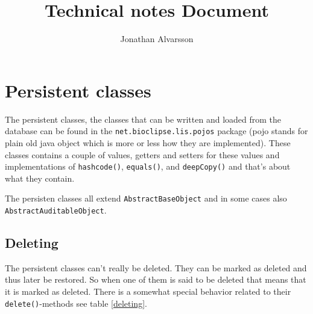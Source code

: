 \documentclass[a4paper,10pt]{article}
\title{Technical notes Document}
\author{Jonathan Alvarsson}
\begin{document}
        
    \pagestyle{fancy}	

    \renewcommand{\sectionmark}[1]{\markboth{#1}{}}

    \fancyhead{}

    \fancyhead[RO]{\large\textbf{{\leftmark}}}

    \fancyhead[LO]{\large\textbf{\today}}

    \headheight=18pt
        
    \setcounter{tocdepth}{3}
        
    \maketitle 
    \newpage 
    
    \tableofcontents 
    \newpage
        
	\section{Persistent classes}
	
    \begin{multicols}{2}
        \noindent The persistent classes, the classes that can be written and
        loaded from the database can be found in the
        \texttt{net.bioclipse.lis.pojos} package (pojo stands for plain old
        java object which is more or less how they are implemented). These
        classes contains a couple of values, getters and setters for these
        values and implementations of \texttt{hashcode()}, \texttt{equals()},
        and \texttt{deepCopy()} and that's about what they contain.
    	
        The persisten classes all extend \texttt{AbstractBaseObject} and in
        some cases also \texttt{AbstractAuditableObject}.
   
        \subsection{Deleting} The persistent classes can't really be deleted.
        They can be marked as deleted and thus later be restored. So when one
        of them is said to be deleted that means that it is marked as deleted.
        There is a somewhat special behavior related to their
        \texttt{delete()}-methods see table \ref{deleting}. 
   
    \end{multicols}
\end{document}
